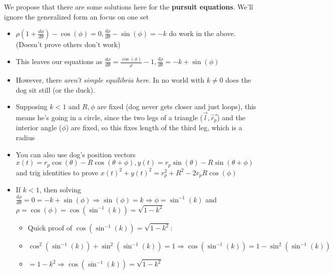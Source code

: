 \documentclass[11pt, oneside]{article}   	%
\begin{document}
\begin{itemize}
We propose that there are some solutions here for the \textbf{pursuit equations}.  We'll ignore the generalized form an focus on one set
\begin{itemize}
\item $\rho(1+\frac{d\phi}{d\theta}) - \cos(\phi) = 0, \frac{d\rho}{d\theta} - \sin(\phi) = -k$ do work in the above.  (Doesn't prove others don't work)
\item This leaves our equations as $\frac{d\phi}{d\theta} = \frac{\cos(\phi)}{\rho}-1, \frac{d\rho}{d\theta} = -k + \sin(\phi)$
\item However, there \emph{aren't simple equilibria here}.  In no world with $k \neq 0$ does the dog sit still (or the duck).
\item Supposing $k<1$ and $R, \phi$ are fixed (dog never gets closer and just loops), this means he's going in a circle, since the two legs of a triangle ($\vec{l}, \vec{r_p}$) and the interior angle ($\phi$) are fixed, so this fixes length of the third leg, which is a radius
\item You can also use dog's position vectors $x(t) = r_p\cos(\theta) - R\cos(\theta + \phi),y(t)=  r_p\sin(\theta) - R\sin(\theta + \phi)$ and trig identities to prove $x(t)^2 + y(t)^2 = r_p^2+R^2 - 2r_pR\cos(\phi)$
\item If $k < 1$, then solving $ \frac{d\rho}{d\theta} = 0 = -k + \sin(\phi) \Rightarrow \sin(\phi) = k \Rightarrow \phi = \sin^{-1}(k)$ and $\rho = \cos(\phi) = \cos(\sin^{-1}(k)) = \sqrt{1-k^2}$
\begin{itemize}
\item Quick proof of $ \cos(\sin^{-1}(k)) = \sqrt{1-k^2}$:
\item  $\cos^2(\sin^{-1}(k)) +  \sin^2(\sin^{-1}(k)) = 1 \Rightarrow  \cos(\sin^{-1}(k)) = 1 -  \sin^2(\sin^{-1}(k))$
\item $= 1-k^2 \Rightarrow  \cos(\sin^{-1}(k)) = \sqrt{1-k^2}$
\end{itemize}


\end{itemize}
\end{itemize}
\end{document}

